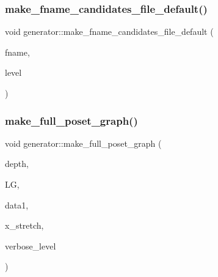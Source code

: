 \mbox{\label{classgenerator_a156a357186802bc8665a435c6192b96f}} 
\subsubsection{\texorpdfstring{make\+\_\+fname\+\_\+candidates\+\_\+file\+\_\+default()}{make\_fname\_candidates\_file\_default()}}
{\footnotesize\ttfamily void generator\+::make\+\_\+fname\+\_\+candidates\+\_\+file\+\_\+default (\begin{DoxyParamCaption}\item[{\mbox{\hyperlink{galois_8h_ab6cc7b4aeb6ea31aba2b3fbfc83ff5e6}{B\+Y\+TE}} $\ast$}]{fname,  }\item[{\mbox{\hyperlink{galois_8h_a09fddde158a3a20bd2dcadb609de11dc}{I\+NT}}}]{level }\end{DoxyParamCaption})}

\mbox{\label{classgenerator_ab6415c4a8fbcc54c470448935a95aa56}} 
\subsubsection{\texorpdfstring{make\+\_\+full\+\_\+poset\+\_\+graph()}{make\_full\_poset\_graph()}}
{\footnotesize\ttfamily void generator\+::make\+\_\+full\+\_\+poset\+\_\+graph (\begin{DoxyParamCaption}\item[{\mbox{\hyperlink{galois_8h_a09fddde158a3a20bd2dcadb609de11dc}{I\+NT}}}]{depth,  }\item[{\mbox{\hyperlink{classlayered__graph}{layered\+\_\+graph}} $\ast$\&}]{LG,  }\item[{\mbox{\hyperlink{galois_8h_a09fddde158a3a20bd2dcadb609de11dc}{I\+NT}}}]{data1,  }\item[{double}]{x\+\_\+stretch,  }\item[{\mbox{\hyperlink{galois_8h_a09fddde158a3a20bd2dcadb609de11dc}{I\+NT}}}]{verbose\+\_\+level }\end{DoxyParamCaption})}

